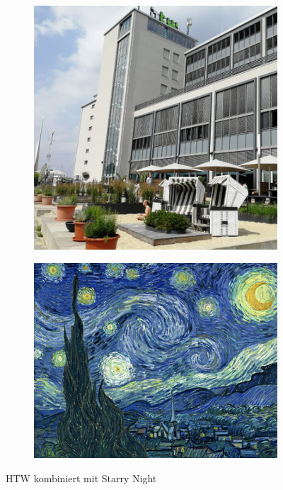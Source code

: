 \begin{figure}[H]
    \centering
    \begin{subfigure}[h]{0.20\textwidth}
        \centering
        \includegraphics[width=\textwidth]{resources/content/content/htw-768x768.jpg}
    \end{subfigure}
    \begin{subfigure}[h]{0.20\textwidth}
        \centering
        \includegraphics[width=\textwidth]{resources/content/style/starry_night.jpg}
    \end{subfigure}
    \caption{HTW kombiniert mit Starry Night}
\end{figure}

